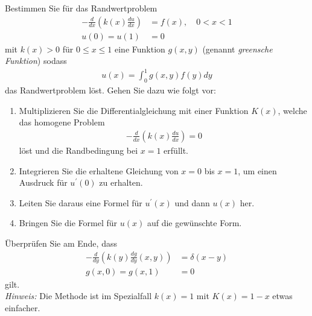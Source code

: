 
\begin{exercise}

Bestimmen Sie für das Randwertproblem
\begin{align*}
  -\frac{d}{dx}\left(k(x)\frac{du}{dx}\right) &= f(x), \quad 0 < x < 1 \\
  u(0) = u(1) &= 0
\end{align*}
mit $k(x) > 0$ für $0 \leq x \leq 1$ eine Funktion $g(x,y)$ (genannt
\textit{greensche Funktion}) sodass
\begin{align*}
  u(x) = \int_0^1g(x,y)f(y)dy
\end{align*}
das Randwertproblem löst. Gehen Sie dazu wie folgt vor:
\begin{enumerate}[label = (\roman*)]
  \item Multiplizieren Sie die Differentialgleichung mit einer Funktion $K(x)$,
  welche das homogene Problem
  \begin{align*}
    -\frac{d}{dx}\left(k(x)\frac{du}{dx}\right) = 0
  \end{align*}
  löst und die Randbedingung bei $x = 1$ erfüllt.
  \item Integrieren Sie die erhaltene Gleichung von $x = 0$ bis $x = 1$, um einen
  Ausdruck für $u^{\prime}(0)$ zu erhalten.
  \item Leiten Sie daraus eine Formel für $u^{\prime}(x)$ und dann $u(x)$ her.
  \item Bringen Sie die Formel für $u(x)$ auf die gewünschte Form.
\end{enumerate}
Überprüfen Sie am Ende, dass
\begin{align*}
  -\frac{d}{dy}\left(k(y)\frac{dg}{dy}(x,y)\right) &= \delta(x-y) \\
  g(x,0) = g(x,1) &= 0
\end{align*}
gilt. \\
\textit{Hinweis:} Die Methode ist im Spezialfall $k(x) = 1$ mit $K(x) = 1 - x$ etwas einfacher.
\end{exercise}


